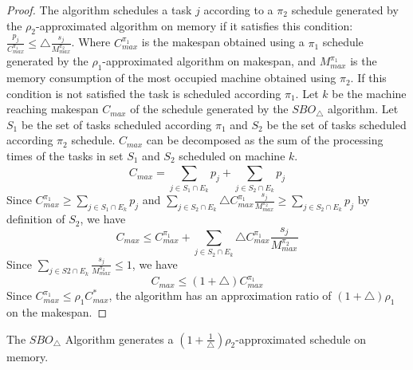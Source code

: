  \begin{proof}
The algorithm schedules a task $j$ according to a $\pi_2$ schedule generated by the $\rho_2$-approximated algorithm on memory if it satisfies  this condition: $\frac{{p_j}}{{C}^{\pi_1}_{max}} \leq \triangle \frac{s_j}{M^{\pi_2}_{max}}$.  Where ${C}^{\pi_1}_{max}$ is the makespan obtained using a $\pi_1$ schedule generated by the  $\rho_1$-approximated algorithm on makespan, and ${M}^{\pi_1}_{max}$ is the memory consumption of the most occupied machine obtained using $\pi_2$.  If this condition is not satisfied the task is scheduled according $\pi_1$.
 Let $k$ be the machine reaching makespan $C_{max}$ of the schedule generated by the $SBO_\triangle$ algorithm. Let  $S_1$ be the set of tasks scheduled according $\pi_1$ and $S_2$ be the set of tasks scheduled according $\pi_2$ schedule.  $C_{max}$ can be decomposed as the sum of the processing times of the tasks in set $S_1$ and $S_2$ scheduled on machine $k$.
                        \begin{equation}\nonumber
                  C_{max}= \sum_{j \in S_1 \cap E_k}^{}p_j+\sum_{j \in S_2 \cap E_k}^{}p_j 
                        \end{equation}                   
 Since $C^{\pi_1}_{max} \geq \sum\limits
                        _{j \in S_1 \cap E_k}^{}p_j$ and $\sum\limits
                        _{j \in S_2\cap E_k}\triangle {{C}^{\pi_1}_{max}} \frac{s_j}{M^{\pi_2}_{max}}\geq \sum\limits
                        _{j \in S_2\cap E_k}{p}_j $ by definition of $S_2$, we have
        \begin{equation}\nonumber
    C_{max}\leq C^{\pi_1}_{max}+\sum_{j \in S_2\cap E_k}^{}\triangle {{C}^{\pi_1}_{max}} \frac{s_j}{M^{\pi_2}_{max}}
                               \end{equation}        
      Since $\sum\limits_{j \in S2\cap E_k} \frac{s_j}{M^{\pi_2}_{max}}\leq 1$, we have
 \begin{equation}\nonumber                       C_{max}\leq(1+\triangle){C}^{\pi_1}_{max}                \end{equation}
Since ${C}^{\pi_1}_{max} \leq \rho_1 {C}^{*}_{max}$, the algorithm has an approximation ratio of $ (1+\triangle)  \rho_1$ on the makespan.
\end{proof}
\begin{property}\citet{10.1109/IPDPS.2008.4536292}
  The $SBO_\triangle$ Algorithm generates a $ (1+\frac{1}{\triangle})  \rho_2$-approximated schedule on memory.
  \end{property}         
